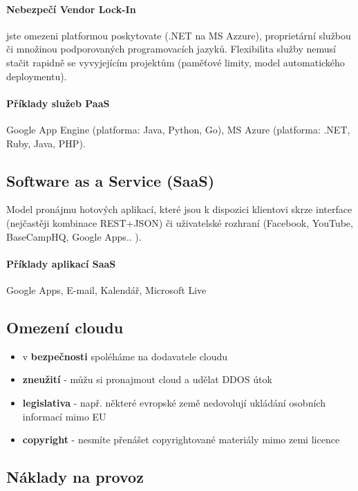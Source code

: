 \paragraph{Nebezpečí Vendor Lock-In} jste omezeni platformou poskytovate (.NET na MS Azzure), proprietární službou či množinou podporovaných programovacích jazyků. Flexibilita služby nemusí stačit rapidně se vyvyjejícím projektům (paměťové limity, model automatického deploymentu).

\paragraph{Příklady služeb PaaS} Google App Engine (platforma: Java, Python, Go), MS Azure (platforma: .NET, Ruby, Java, PHP).

\subsection{Software as a Service (SaaS)}
Model pronájmu hotových aplikací, které jsou k dispozici klientovi skrze interface (nejčastěji kombinace REST+JSON) či uživatelské rozhraní (Facebook, YouTube, BaseCampHQ, Google Apps.. ).
\paragraph{Příklady aplikací SaaS} Google Apps, E-mail, Kalendář, Microsoft Live

\subsection{Omezení cloudu}
\begin{itemize}[itemsep=0px]
\item v \textbf{bezpečnosti} spoléháme na dodavatele cloudu
\item \textbf{zneužití} - můžu si pronajmout cloud a udělat DDOS útok
\item \textbf{legislativa} - např. některé evropské země nedovolují ukládání osobních informací mimo EU
\item \textbf{copyright} - nesmíte přenášet copyrightované materiály mimo zemi licence
\end{itemize}

\subsection{Náklady na provoz}
